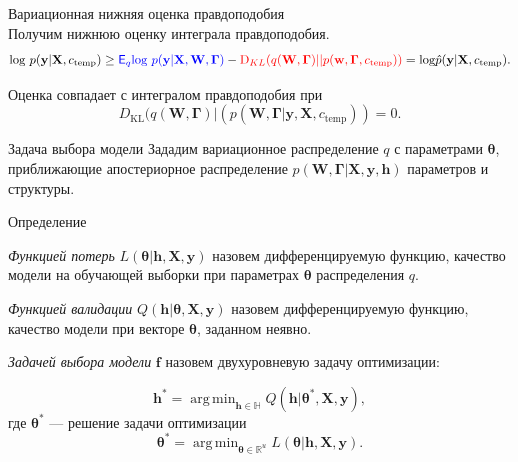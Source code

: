 \documentclass[usenames,dvipsnames,11pt,pdf,utf8,russian,aspectratio=43]{beamer}
\DeclareMathOperator*{\argmin}{arg\,min}
\begin{document}
\begin{frame}{Вариационная нижняя оценка правдоподобия}
~\\Получим нижнюю оценку интеграла правдоподобия.
$$                                                                                                                                              
        \text{log}~p(\mathbf{y}|\mathbf{X}, c_\text{temp}) \geq 
\textcolor{blue}{\mathsf{E}_q \text{log}~{p(\mathbf{y} | \mathbf{X}, \mathbf{W}, \boldsymbol{\Gamma})}} - \textcolor{red}{\text{D}_{KL}(q(\mathbf{W}, \boldsymbol{\Gamma})||p(\mathbf{w}, \boldsymbol{\Gamma}, c_\text{temp}))} = \text{log}\hat{{p}}(\mathbf{y}|\mathbf{X}, c_\text{temp}).
$$ 



Оценка совпадает с интегралом правдоподобия при $$D_\text{KL}(q(\mathbf{W}, \boldsymbol{\Gamma})|(p(\mathbf{W}, \boldsymbol{\Gamma}|\mathbf{y}, \mathbf{X}, c_\text{temp}))=0.$$

\end{frame}      


\begin{frame}{Задача выбора модели}
\footnotesize
Зададим вариационное распределение $q$ с параметрами $\boldsymbol{\theta}$, приближающие апостериорное распределение $p(\mathbf{W}, \boldsymbol{\Gamma}|\mathbf{X}, \mathbf{y}, \mathbf{h})$ параметров и структуры.



\begin{block}{Определение}

\textit{Функцией потерь} $L( \boldsymbol{\theta}| \mathbf{h}, \mathbf{X}, \mathbf{y})$   назовем дифференцируемую функцию, качество модели на обучающей выборки при параметрах $\boldsymbol{\theta}$ распределения $q$.
\end{block}
\begin{block}{}
\textit{Функцией валидации} $Q(\mathbf{h}| \boldsymbol{\theta}, \mathbf{X}, \mathbf{y} )$ назовем дифференцируемую функцию, качество модели при векторе $\boldsymbol{\theta}$, заданном неявно.
\end{block}
\begin{block}{}
\textit{Задачей выбора модели} $\mathbf{f}$ назовем двухуровневую задачу оптимизации:

\[
	\mathbf{h}^{*} = \argmin_{\mathbf{h} \in \mathbb{H}} Q(\mathbf{h}|  \boldsymbol{\theta}^{*}, \mathbf{X}, \mathbf{y} ),
\]
где $\boldsymbol{\theta}^{*}$ --- решение задачи оптимизации
\[
   \boldsymbol{\theta}^{*} = \argmin_{\boldsymbol{\theta} \in \mathbb{R}^u} L(\boldsymbol{\theta}|  \mathbf{h},  \mathbf{X}, \mathbf{y}).
\]
\end{block}


\end{frame}
\end{document}
